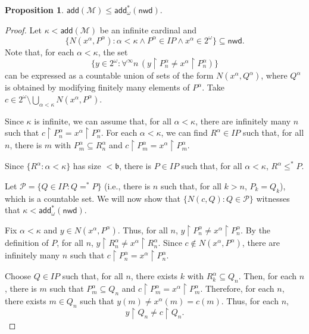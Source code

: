 \documentclass{amsart}
\theoremstyle{definition}
\newtheorem{proposition}[theorem]{Proposition}
\theoremstyle{remark}
\numberwithin{equation}{section}
\newcommand{\nwd}{\mathsf{nwd}}
\newcommand{\add}{\mathsf{add}}
\begin{document}
\begin{proposition}
    $\add(\mathcal{M})\leq \add^*_\omega(\nwd)$.
\end{proposition}
\begin{proof}
    Let $\kappa<\add(\mathcal{M})$ be an infinite cardinal and 
    \[\{N(x^\alpha,P^\alpha): \alpha<\kappa \wedge P^\alpha\in IP \wedge x^\alpha\in 2^\omega\}\subseteq \nwd.\]
    Note that, for each $\alpha<\kappa$, the set 
    \[
    \{ y\in 2^\omega : \forall^\infty n \,(y\!\upharpoonright P_n^\alpha \neq x^\alpha \!\upharpoonright P_n^\alpha)\}
    \]
    can be expressed as a countable union of sets of the form $N(x^\alpha, Q^\alpha)$, where $Q^\alpha$ is obtained by modifying finitely many elements of $P^\alpha$. Take $c\in 2^\omega\setminus \bigcup_{\alpha<\kappa}N(x^\alpha, P^\alpha)$. 

    Since $\kappa$ is infinite, we can assume that, for all $\alpha<\kappa$, there are infinitely many $n$ such that $c\!\upharpoonright P^\alpha_n = x^\alpha \!\upharpoonright P^\alpha_n$. For each $\alpha<\kappa$, we can find $R^\alpha\in IP$ such that, for all $n$, there is $m$ with $P^\alpha_m \subseteq R^\alpha_n$ and $c\!\upharpoonright P^\alpha_m = x^\alpha\!\upharpoonright P^\alpha_m$. 

    Since $\{R^\alpha:\alpha<\kappa\}$ has size $<\mathfrak{b}$, there is $P\in IP$ such that, for all $\alpha <\kappa$, $R^\alpha \leq^* P$.

    Let $\mathcal{P}=\{Q\in IP : Q =^* P\}$ (i.e., there is $n$ such that, for all $k>n$, $P_k = Q_k$), which is a countable set. We will now show that $\{N(c,Q) : Q\in\mathcal{P}\}$ witnesses that $\kappa < \add^*_\omega(\nwd)$.

    Fix $\alpha<\kappa$ and $y\in N(x^\alpha, P^\alpha)$. Thus, for all $n$, $y\!\upharpoonright P_n^\alpha \neq x^\alpha\!\upharpoonright P_n^\alpha$. By the definition of $P$, for all $n$, $y\!\upharpoonright R_n^\alpha \neq x^\alpha\!\upharpoonright R_n^\alpha$. Since $c\notin N(x^\alpha, P^\alpha)$, there are infinitely many $n$ such that $c\!\upharpoonright P_n^\alpha = x^\alpha\!\upharpoonright P_n^\alpha$.  

    Choose $Q\in IP$ such that, for all $n$, there exists $k$ with  $R_k^\alpha \subseteq Q_n$. Then, for each $n$, there is $m$ such that $P_m^\alpha \subseteq Q_n$ and $c\!\upharpoonright P_m^\alpha = x^\alpha\!\upharpoonright P_m^\alpha$. Therefore, for each $n$, there exists $m\in Q_n$ such that  $y(m)\neq x^\alpha(m)=c(m)$. Thus, for each $n$,
    \[
    y\!\upharpoonright Q_n \neq c\!\upharpoonright Q_n.
    \]

\end{proof}
\end{document}
